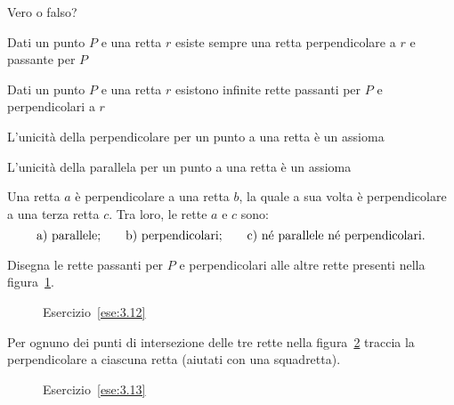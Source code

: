 \begin{esercizio}
\label{ese:3.10}
Vero o falso?
\begin{enumeratea}
\item Dati un punto $P$ e una retta $r$ esiste sempre una retta 
perpendicolare a $r$ e passante per $P$\tab\hfill\boxV\quad\boxF
\item Dati un punto $P$ e una retta $r$ esistono infinite rette 
passanti per $P$ e perpendicolari a $r$\tab\hfill\boxV\quad\boxF
\item L'unicità della perpendicolare per un punto a una retta è un 
assioma\hfill\boxV\quad\boxF
\item L'unicità della parallela per un punto a una retta è un 
assioma\hfill\boxV\quad\boxF
\end{enumeratea}
\end{esercizio}

\begin{esercizio}
\label{ese:3.11}
Una retta $a$ è perpendicolare a una retta $b$, la quale a sua volta 
è perpendicolare a una terza retta $c$. Tra loro, le rette $a$ e $c$ 
sono:
\[\text{a) parallele;\qquad b) perpendicolari;\qquad c) né parallele 
né perpendicolari.}\]
\end{esercizio}

\begin{esercizio}
\label{ese:3.12}
Disegna le rette passanti per $P$ e perpendicolari alle altre rette 
presenti nella figura~\ref{fig:ese3.12}.
\end{esercizio}

\begin{inaccessibleblock}
 \begin{figure}[htb]
\centering
\caption{Esercizio~\ref{ese:3.12}}\label{fig:ese3.12}
\end{figure}
\end{inaccessibleblock}

\begin{esercizio}
\label{ese:3.13}
Per ognuno dei punti di intersezione delle tre rette nella 
figura~\ref{fig:ese3.13} traccia la perpendicolare a ciascuna retta 
(aiutati con una squadretta).
\end{esercizio}

\begin{inaccessibleblock}
 \begin{figure}[htb]
\centering
\caption{Esercizio~\ref{ese:3.13}}\label{fig:ese3.13}
\end{figure}
\end{inaccessibleblock}

